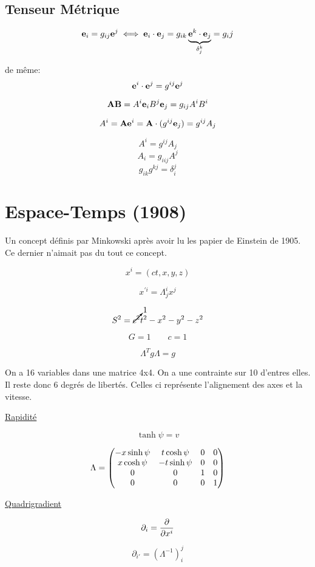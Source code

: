 \subsection*{Tenseur Métrique}


$$\vb{e}_i = g_{ij} \vb{e}^j \iff \vb{e}_i \cdot \vb{e}_j = g_{ik} \underbrace{\vb{e}^k \cdot \vb{e}_j}_{\delta_j^k}= g_ij $$ 

de même: $$\vb{e}^i \cdot \vb{e}^j = g^{ij}\vb{e}^j$$ 

$$\vb{A} \vb{B} = A^{i}\vb{e}_i B^{j}\vb{e}_j = g_{ij} A^{i}B^i$$ 

$$A^{i}=\vb{A}\vb{e}^i = \vb{A} \cdot  (g^{ij}\vb{e}_j) = g^{ij}A_j$$ 


\begin{tcolorbox}[title=]
	 $$A^{i}= g^{ij}A_j$$ 
	 $$A_i = g_{iij} A^j$$ 
$$g_{ik} g^{kj}= \delta_i^{j}$$ 
\end{tcolorbox}

\section*{Espace-Temps (1908)}

Un concept définis par Minkowski après avoir lu les papier de Einstein de 1905. Ce dernier n'aimait pas du tout ce concept. 

\begin{tcolorbox}[title=Quadrivecteur]
$$x^{i}= (ct, x, y, z)$$ 
\end{tcolorbox}


\begin{tcolorbox}[title=Transformation de Lorentz]
$$x^{\prime{}i} = \Lambda_j^{i} x^j$$
\end{tcolorbox}

\begin{tcolorbox}[title=Intervalle]
$$	S^{2}= \cancelto{1}{c^2}t^{2}- x^{2}-y^{2}-z^2$$ 
\end{tcolorbox}


\begin{tcolorbox}[title=unitées Géométriques]
	$$G= 1 \qquad c= 1$$ 
\end{tcolorbox}


\begin{tcolorbox}[title=Transformation de Lorentz]
	 $$\Lambda^{T}g\Lambda =g$$ 
\end{tcolorbox}

On a 16 variables dans une matrice 4x4. On a une contrainte sur 10 d'entres elles. Il reste donc 6 degrés de libertés. Celles ci représente l'alignement des axes et la vitesse.

\underline{Rapidité} 


$$\tanh{\psi} = v$$

$$\Lambda = \begin{pmatrix} -x\sinh{\psi} & t\cosh{\psi} &0 &0\\x\cosh\psi &- t\sinh\psi & 0 &0\\ 0 & 0 &1 &0 \\ 0& 0 &0 &1 \end{pmatrix}$$ 

\underline{Quadrigradient} 

$$\partial_i = \pdv{x^i}$$

$$\boxed{\partial_{i'} = (\Lambda^{-1})_i^{j}}$$ 


